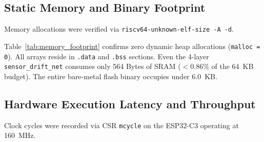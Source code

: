 \documentclass[conference]{IEEEtran}
\begin{document}
\subsection{Static Memory and Binary Footprint}
Memory allocations were verified via \texttt{riscv64-unknown-elf-size -A -d}.

\begin{table}[t]
\centering
\caption{Static Memory Footprint, Dynamic Allocations, and Flash Sizes}
\label{tab:memory_footprint}
\end{table}

Table~\ref{tab:memory_footprint} confirms zero dynamic heap allocations (\texttt{malloc = 0}). All arrays reside in \texttt{.data} and \texttt{.bss} sections. Even the 4-layer \texttt{sensor\_drift\_net} consumes only 564 Bytes of SRAM ($< 0.86\%$ of the 64~KB budget). The entire bare-metal flash binary occupies under 6.0~KB.

\subsection{Hardware Execution Latency and Throughput}
Clock cycles were recorded via CSR \texttt{mcycle} on the ESP32-C3 operating at 160~MHz.

\begin{table}[t]
\centering
\caption{Hardware Clock Cycles and Latency Measured via CSR \texttt{mcycle}}
\label{tab:latency}
\end{table}
\end{document}
